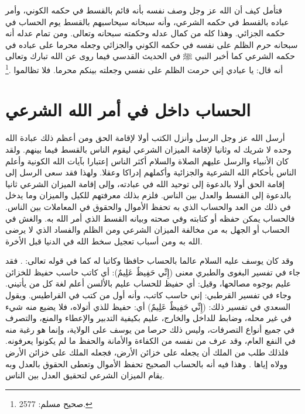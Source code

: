 فتأمل كيف أن الله عز وجل وصف نفسه بأنه قائم بالقسط في حكمه الكوني، وأمر عباده بالقسط في حكمه الشرعي، وأنه سبحانه سيحاسبهم بالقسط يوم الحساب في حكمه الجزائي. وهذا كله من كمال عدله وحكمته سبحانه وتعالى. ومن تمام عدله أنه سبحانه حرم الظلم على نفسه في حكمه الكوني والجزائي وجعله محرما على عباده في حكمه الشرعي كما أخبر النبي ﷺ في الحديث القدسي فيما روى عن الله تبارك وتعالى أنه قال: يا عبادي إني حرمت الظلم على نفسي وجعلته بينكم محرما. فلا تظالموا \href{https://shamela.ws/book/1727/6507#p3}{\faExternalLink} \cite{muslim}.\footnote{صحيح مسلم: 2577.}

\section{الحساب داخل في أمر الله الشرعي}

أرسل الله عز وجل الرسل وأنزل الكتب أولا لإقامة الحق ومن أعظم ذلك عبادة الله وحده لا شريك له وثانيا لإقامة الميزان الشرعي ليقوم الناس بالقسط فيما بينهم. ولقد كان الأنبياء والرسل عليهم الصلاة والسلام أكثر الناس إعتبارا بآيات الله الكونية وأعلم الناس بأحكام الله الشرعية والجزائية وأكملهم إدراكا وعقلا. ولهذا فقد سعى الرسل إلى إقامة الحق أولا بالدعوة إلى توحيد الله في عبادته، وإلى إقامة الميزان الشرعي ثانيا بالدعوة إلى القسط والعدل بين الناس. فلزم بذلك معرفتهم للكيل والميزان وما يدخل في ذلك من العد والحساب الذي به تحفظ الأموال والحقوق في المعاملات بين الناس. فالحساب يمكن حفظه أو كتابته وفي صحته وبيانه القسط الذي أمر الله به. والغش في الحساب أو الجهل به من مخالفة الميزان الشرعي ومن الظلم والفساد الذي لا يرضى الله به ومن أسباب تعجيل سخط الله في الدنيا قبل الأخرة. 

وقد كان يوسف عليه السلام عالما بالحساب حافظا وكاتبا له كما في قوله تعالى: \quranayah*[12][55]{\footnotesize \surahname*[12]}. فقد جاء في تفسير البغوى والطبري معنى (إِنِّي حَفِيظٌ عَلِيمٌ): أي كاتب حاسب حفيظ للخزائن عليم بوجوه مصالحها، وقيل: أي حفيظ للحساب عليم بالألسن أعلم لغة كل من يأتيني. وجاء في تفسير القرطبي: إني حاسب كاتب، وأنه أول من كتب في القراطيس. ويقول السعدي في تفسير ذلك: (إِنِّي حَفِيظٌ عَلِيمٌ) أي: حفيظ للذي أتولاه، فلا يضيع منه شيء في غير محله، وضابط للداخل والخارج، عليم بكيفية التدبير والإعطاء والمنع، والتصرف في جميع أنواع التصرفات، وليس ذلك حرصا من يوسف على الولاية، وإنما هو رغبة منه في النفع العام، وقد عرف من نفسه من الكفاءة والأمانة والحفظ ما لم يكونوا يعرفونه. فلذلك طلب من الملك أن يجعله على خزائن الأرض، فجعله الملك على خزائن الأرض وولاه إياها \href{https://shamela.ws/book/42/841#p5}{\faExternalLink} \cite{tafsir_Saadi}. وهذا فيه أنه بالحساب الصحيح تحفظ الأموال وتعطى الحقوق بالعدل وبه يقام الميزان الشرعي لتحقيق العدل بين الناس.

